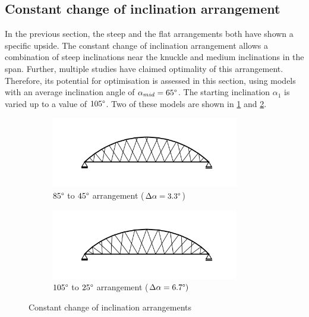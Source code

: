 \subsection{Constant change of inclination arrangement}\label{sec:constant_change}
In the previous section, the steep and the flat arrangements both have shown a specific upside. The constant change of inclination arrangement allows a combination of steep inclinations near the knuckle and medium inclinations in the span. Further, multiple studies have claimed optimality of this arrangement. Therefore, its potential for optimisation is assessed in this section, using models with an average inclination angle of $\alpha_{mid} = 65\degree$. The starting inclination $\alpha_1$ is varied up to a value of $105\degree$. Two of these models are shown in \cref{fig:arrangement_85_45} and \cref{fig:arrangement_105_25}.

\begin{figure}[H]
\centering
\begin{subfigure}{0.5\textwidth}
    \centering
    \includegraphics[trim={1.5cm 1cm 1.3cm 1cm},clip, width=0.9\textwidth]{calculations/constant change arrangement/arrangement_85_45.png}
    \caption{$85\degree$ to $45\degree$ arrangement ($\Delta\alpha=3.3\degree$)}
    \label{fig:arrangement_85_45}
\end{subfigure}%
\begin{subfigure}{.5\textwidth}
    \centering
    \includegraphics[trim={1.5cm 1cm 1.3cm 1cm},clip, width=0.9\textwidth]{calculations/constant change arrangement/arrangement_105_25.png}
    \caption{$105\degree$ to $25\degree$ arrangement ($\Delta\alpha=6.7\degree)$}
    \label{fig:arrangement_105_25}
\end{subfigure}
\caption{Constant change of inclination arrangements}
\label{fig:constant change arrangements}
\end{figure}

